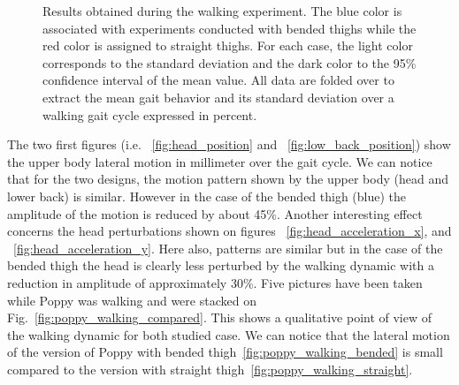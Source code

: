 \begin{figure}[!h]
    \hfil
    \hfil
    \hfil
    \hfil
    \hfil
    \caption{Results obtained during the walking experiment.
    The blue color is associated with experiments conducted with bended thighs while the red color is assigned to straight thighs.
    For each case, the light color corresponds to the standard deviation and the dark color to the 95\% confidence interval of the mean value.
    All data are folded over to extract the mean gait behavior and its standard deviation over a walking gait cycle expressed in percent.}
    \label{fig:walk_result}
\end{figure}

The two first figures (i.e. ~\ref{fig:head_position} and ~\ref{fig:low_back_position}) show the upper body lateral motion in millimeter over the gait cycle. We can notice that for the two designs, the motion pattern shown by the upper body (head and lower back) is similar. However in the case of the bended thigh (blue) the amplitude of the motion is reduced by about 45\%. Another interesting effect concerns the head perturbations shown on figures ~\ref{fig:head_acceleration_x}, and ~\ref{fig:head_acceleration_y}. Here also, patterns are similar but in the case of the bended thigh the head is clearly less perturbed by the walking dynamic with a reduction in amplitude of approximately 30\%. Five pictures have been taken while Poppy was walking and were stacked on Fig.~\ref{fig:poppy_walking_compared}. This shows a qualitative point of view of the walking dynamic for both studied case.
We can notice that the lateral motion of the version of Poppy with bended thigh~\ref{fig:poppy_walking_bended} is small compared to the version with straight thigh~\ref{fig:poppy_walking_straight}.


